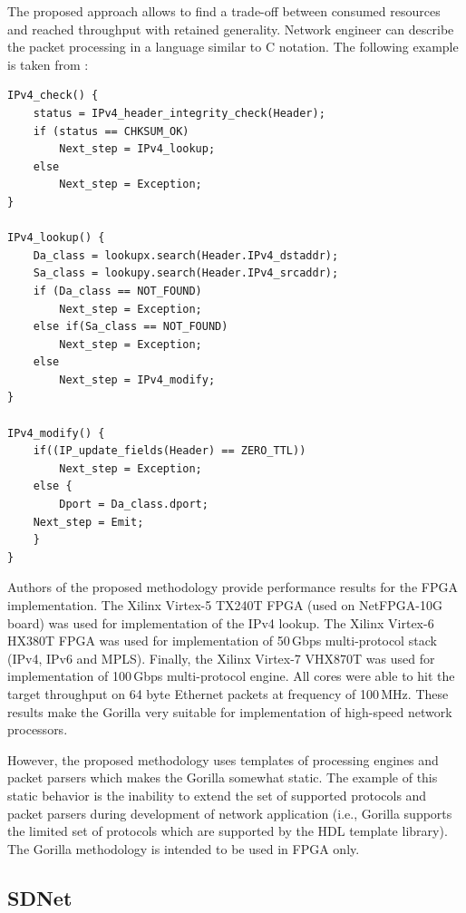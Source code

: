 The proposed approach allows to find a trade-off between consumed resources and reached throughput with retained generality. 
Network engineer can describe the packet processing in a language similar to C notation. The following example is taken from \cite{GorillaFPGA2012}:

\begin{Verbatim}[fontsize=\small]
IPv4_check() {
    status = IPv4_header_integrity_check(Header);
    if (status == CHKSUM_OK)
        Next_step = IPv4_lookup;
    else
        Next_step = Exception;
}

IPv4_lookup() {
    Da_class = lookupx.search(Header.IPv4_dstaddr);
    Sa_class = lookupy.search(Header.IPv4_srcaddr);
    if (Da_class == NOT_FOUND)
        Next_step = Exception;
    else if(Sa_class == NOT_FOUND)
        Next_step = Exception;
    else
        Next_step = IPv4_modify;
}

IPv4_modify() {
    if((IP_update_fields(Header) == ZERO_TTL))
        Next_step = Exception;
    else {
        Dport = Da_class.dport;
    Next_step = Emit;
    }
}
\end{Verbatim}

Authors of the proposed methodology provide performance results for the FPGA implementation. 
The Xilinx Virtex-5 TX240T FPGA (used on NetFPGA-10G board) was
used for implementation of the IPv4 lookup. The Xilinx Virtex-6 HX380T FPGA was used for implementation of 50\,Gbps multi-protocol stack
(IPv4, IPv6 and MPLS).
Finally, the Xilinx Virtex-7 VHX870T was used for implementation of 100\,Gbps multi-protocol engine. 
All cores were able to hit the target throughput on 64 byte Ethernet packets at frequency of 100\,MHz.
These results make the Gorilla very suitable for implementation of high-speed network processors.

However, the proposed methodology uses templates of processing engines and packet parsers which makes the Gorilla somewhat static. 
The example of this static behavior is the inability to extend the set of supported protocols and packet parsers during development of network application 
(i.e., Gorilla supports the limited set of protocols which are supported by the HDL template library). 
The Gorilla methodology is intended to be used in FPGA only.

\subsection{SDNet}
% 

